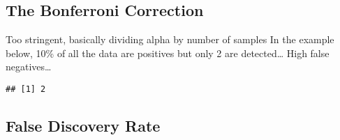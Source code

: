 \documentclass[]{article}
\newenvironment{Shaded}{\begin{snugshade}}{\end{snugshade}}
\newcommand{\ControlFlowTok}[1]{\textcolor[rgb]{0.13,0.29,0.53}{\textbf{#1}}}
\newcommand{\DecValTok}[1]{\textcolor[rgb]{0.00,0.00,0.81}{#1}}
\newcommand{\KeywordTok}[1]{\textcolor[rgb]{0.13,0.29,0.53}{\textbf{#1}}}
\newcommand{\NormalTok}[1]{#1}
\newcommand{\OperatorTok}[1]{\textcolor[rgb]{0.81,0.36,0.00}{\textbf{#1}}}
\newcommand{\StringTok}[1]{\textcolor[rgb]{0.31,0.60,0.02}{#1}}
\begin{document}
\hypertarget{the-bonferroni-correction}{%
\subsection{The Bonferroni Correction}\label{the-bonferroni-correction}}

Too stringent, basically dividing alpha by number of samples In the
example below, 10\% of all the data are positives but only 2 are
detected\ldots{} High false negatives\ldots{}

\begin{Shaded}
\end{Shaded}

\begin{verbatim}
## [1] 2
\end{verbatim}

\hypertarget{false-discovery-rate}{%
\subsection{False Discovery Rate}\label{false-discovery-rate}}
\end{document}
